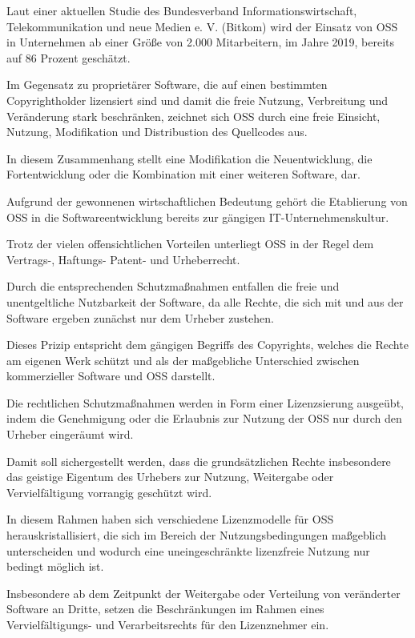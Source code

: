 Laut einer aktuellen Studie des Bundesverband Informationswirtschaft, Telekommunikation und neue Medien e. V. (Bitkom) wird der Einsatz von OSS in Unternehmen ab einer Größe von 2.000 Mitarbeitern, im Jahre 2019, bereits auf 86 Prozent geschätzt.\cite{bitkom_ev_open_nodate} 

Im Gegensatz zu proprietärer Software, die auf einen bestimmten Copyrightholder lizensiert sind und damit die freie Nutzung, Verbreitung und Veränderung stark beschränken, zeichnet sich OSS durch eine freie Einsicht, Nutzung, Modifikation und Distribustion des Quellcodes aus.   

In diesem Zusammenhang stellt eine Modifikation die Neuentwicklung, die Fortentwicklung oder die Kombination mit einer weiteren Software, dar. 

Aufgrund der gewonnenen wirtschaftlichen Bedeutung gehört die Etablierung von OSS in die Softwareentwicklung bereits zur gängigen IT-Unternehmenskultur.\cite[S. 21,22]{allmann_open_2019}  

Trotz der vielen offensichtlichen Vorteilen unterliegt OSS in der Regel dem Vertrags-, Haftungs- Patent- und Urheberrecht.\cite[S. 28 ff.]{kesler_anpassung_2013} 

Durch die entsprechenden Schutzmaßnahmen entfallen die freie und unentgeltliche Nutzbarkeit der Software, da alle Rechte, die sich mit und aus der Software ergeben zunächst nur dem Urheber zustehen.  

Dieses Prizip entspricht dem gängigen Begriffs des Copyrights, welches die Rechte am eigenen Werk schützt und als der maßgebliche Unterschied zwischen kommerzieller Software und OSS darstellt. 

Die rechtlichen Schutzmaßnahmen werden in Form einer Lizenzsierung ausgeübt, indem die Genehmigung oder die Erlaubnis zur Nutzung der OSS nur durch den Urheber eingeräumt wird.\cite{wilmer_rechtliche_2021} 

Damit soll sichergestellt werden, dass die grundsätzlichen Rechte insbesondere das geistige Eigentum des Urhebers zur Nutzung, Weitergabe oder Vervielfältigung vorrangig geschützt wird.

In diesem Rahmen haben sich verschiedene Lizenzmodelle für OSS herauskristallisiert, die sich im Bereich der Nutzungsbedingungen maßgeblich unterscheiden und wodurch eine uneingeschränkte lizenzfreie Nutzung nur bedingt möglich ist.\cite{wilmer_rechtliche_2021} 

Insbesondere ab dem Zeitpunkt der Weitergabe oder Verteilung von veränderter Software an Dritte, setzen die Beschränkungen im Rahmen eines Vervielfältigungs- und Verarbeitsrechts für den Lizenznehmer ein.

